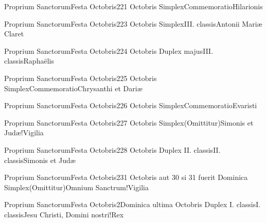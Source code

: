 \documentclass[liber-responsorialis_sanctorale.tex]{subfiles}
\begin{document}
	{Proprium Sanctorum}{Festa Octobris}{2}{21 Octobris}
	{Simplex}{Commemoratio}{Hilarionis}
	{\conprubric}
	{\respdetemp}

	{Proprium Sanctorum}{Festa Octobris}{2}{23 Octobris}
	{Simplex}{III. classis}{Antonii Mariæ Claret}
	{}
	{}
\rubric{\respdetemp}

	{Proprium Sanctorum}{Festa Octobris}{2}{24 Octobris}
	{Duplex majus}{III. classis}{Raphaëlis}
	{}
	{}

	{Proprium Sanctorum}{Festa Octobris}{2}{25 Octobris}
	{Simplex}{Commemoratio}{Chrysanthi et Dariæ}
	{}
	{}
\rubric{\respdetemp}

	{Proprium Sanctorum}{Festa Octobris}{2}{26 Octobris}
	{Simplex}{Commemoratio}{Evaristi}
	{}
	{}
\rubric{\respdetemp}

	{Proprium Sanctorum}{Festa Octobris}{2}{27 Octobris}
	{Simplex}{(Omittitur)}{Simonis et Judæ!Vigilia}
	{}
	{}
\rubric{\respdetemp}

	{Proprium Sanctorum}{Festa Octobris}{2}{28 Octobris}
	{Duplex II. classis}{II. classis}{Simonis et Judæ}
	{}
	{}
\rubric{\apexrubric}

	{Proprium Sanctorum}{Festa Octobris}{2}{31 Octobris aut 30 si 31 fuerit Dominica}
	{Simplex}{(Omittitur)}{Omnium Sanctrum!Vigilia}
	{}
	{}
\rubric{\respdetemp}

	{Proprium Sanctorum}{Festa Octobris}{2}{Dominica ultima Octobris}
	{Duplex I. classis}{I. classis}{Jesu Christi, Domini nostri!Rex}
	{}
	{}
\end{document}
